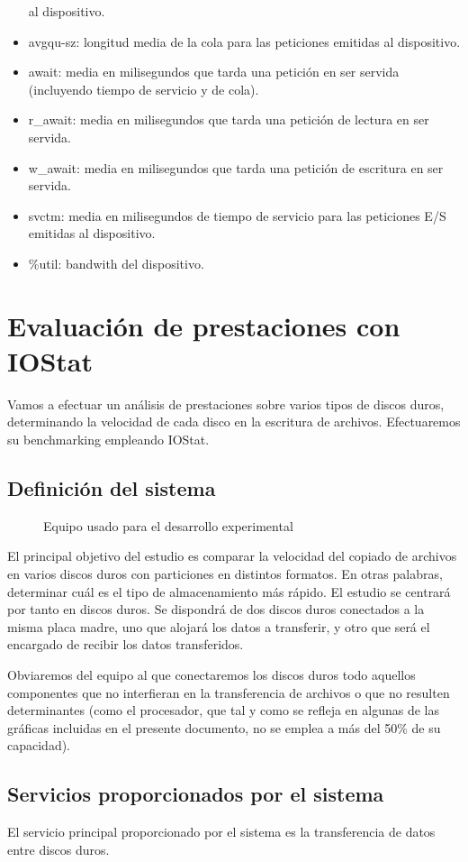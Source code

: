 \documentclass[a4paper,10pt]{article}
\newcommand{\imagent}[5]{
  \begin{figure}
    \begin{center}
    \texttt{[image: \#1]}
    \end{center}
    \caption{#3}
    \label{#4}
  \end{figure}
}
\renewcommand{\texttt}[2][black!60]{\textcolor{#1}{\ttfamily #2}}
\begin{document}
\begin{itemize}
 al dispositivo.
 \item{\texttt{avgqu-sz}}: longitud media de la cola para las peticiones emitidas al dispositivo.
 \item{\texttt{await}}: media en milisegundos que tarda una petición en ser servida (incluyendo tiempo de servicio y de cola).
 \item{\texttt{r\_await}}: media en milisegundos que tarda una petición de lectura en ser servida.
 \item{\texttt{w\_await}}: media en milisegundos que tarda una petición de escritura en ser servida.
 \item{\texttt{svctm}}: media en milisegundos de tiempo de servicio para las peticiones E/S emitidas al dispositivo.
 \item{\texttt{\%util}}: bandwith del dispositivo.
\end{itemize}

\section{Evaluación de prestaciones con IOStat}
Vamos a efectuar un análisis de prestaciones sobre varios tipos de discos duros, determinando la velocidad de cada 
disco en la escritura de archivos. Efectuaremos su benchmarking empleando IOStat.

\subsection{Definición del sistema}
\imagent{system.jpg}{r}{Equipo usado para el desarrollo experimental}{system}{0.6}El principal objetivo del estudio es comparar la velocidad del copiado de archivos en varios discos duros con particiones
en distintos formatos. En otras palabras, determinar cuál es el tipo de almacenamiento más rápido. El estudio se centrará
por tanto en discos duros. Se dispondrá de dos discos duros conectados a la misma placa madre, uno que alojará los datos a
transferir, y otro que será el encargado de recibir los datos transferidos.

Obviaremos del equipo al que conectaremos los discos duros todo aquellos componentes que no interfieran en la transferencia 
de archivos o que no resulten determinantes (como el procesador, que tal y como se refleja en algunas de las gráficas incluidas
en el presente documento, no se emplea a más del 50\% de su capacidad).

\subsection{Servicios proporcionados por el sistema}
El servicio principal proporcionado por el sistema es la transferencia de datos entre discos duros.
\end{document}
